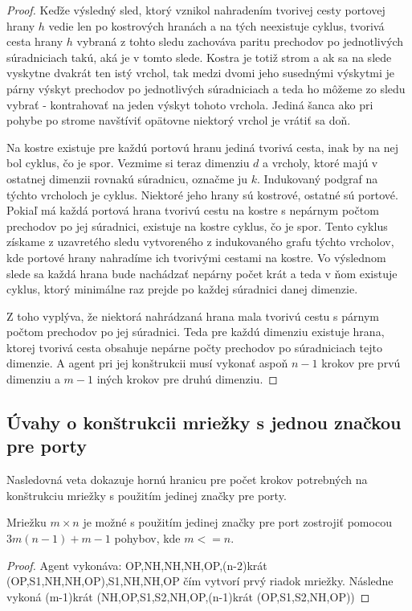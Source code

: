 \begin{proof}
Keďže výsledný sled, ktorý vznikol nahradením tvorivej cesty portovej hrany
$h$ vedie len po kostrových hranách a na tých neexistuje cyklus, tvorivá
cesta hrany $h$ vybraná z tohto sledu zachováva paritu prechodov po
jednotlivých súradniciach takú, aká je v tomto slede.
Kostra je totiž strom a ak sa na slede vyskytne dvakrát ten istý vrchol, tak
medzi dvomi jeho susednými výskytmi je párny výskyt prechodov po
jednotlivých súradniciach a teda ho môžeme zo sledu vybrať - kontrahovať na
jeden výskyt tohoto vrchola. Jediná šanca ako pri pohybe po strome navštíviť
opätovne niektorý vrchol je vrátiť sa doň.

Na kostre existuje pre každú portovú hranu jediná tvorivá cesta, inak by na
nej bol cyklus, čo je spor.
Vezmime si teraz dimenziu $d$ a vrcholy, ktoré majú v ostatnej dimenzii
rovnakú súradnicu, označme ju $k$. Indukovaný podgraf na týchto vrcholoch je
cyklus. Niektoré jeho hrany sú kostrové, ostatné sú portové. Pokiaľ má každá
portová hrana tvorivú cestu na kostre s nepárnym počtom prechodov po jej
súradnici, existuje na kostre cyklus, čo je spor.
Tento cyklus získame z uzavretého sledu vytvoreného z indukovaného grafu
týchto vrcholov, kde portové hrany nahradíme ich tvorivými cestami na
kostre. Vo výslednom slede sa každá hrana bude nachádzať nepárny počet krát
a teda v ňom existuje cyklus, ktorý minimálne raz prejde po každej súradnici
danej dimenzie.

Z toho vyplýva, že niektorá nahrádzaná hrana mala tvorivú cestu s párnym
počtom prechodov po jej súradnici.
Teda pre každú dimenziu existuje hrana, ktorej tvorivá cesta obsahuje
nepárne počty prechodov po súradniciach tejto dimenzie. A agent pri jej
konštrukcii musí vykonať aspoň $n - 1$ krokov pre prvú dimenziu a $m - 1$
iných  krokov pre druhú dimenziu.
\end{proof}

\subsection{Úvahy o konštrukcii mriežky s jednou značkou pre porty}
Nasledovná veta dokazuje hornú hranicu pre počet krokov potrebných na
konštrukciu mriežky s použitím jedinej značky pre porty.

\begin{veta}
Mriežku $m \times n$ je možné s použitím jedinej značky pre port zostrojiť
pomocou $3m(n - 1) + m - 1$ pohybov, kde $m <= n$.
\end{veta}
\begin{proof}
Agent vykonáva: OP,NH,NH,NH,OP,(n-2)krát (OP,S1,NH,NH,OP),S1,NH,NH,OP čím
vytvorí prvý riadok mriežky. Následne vykoná
(m-1)krát (NH,OP,S1,S2,NH,OP,(n-1)krát (OP,S1,S2,NH,OP))
\end{proof}


